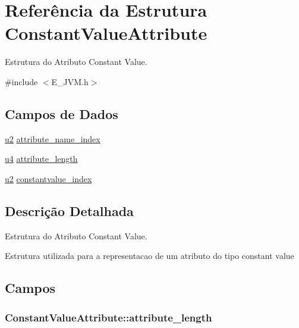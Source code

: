 \hypertarget{struct_constant_value_attribute}{}\section{Referência da Estrutura Constant\+Value\+Attribute}
\label{struct_constant_value_attribute}


Estrutura do Atributo Constant Value.  




{\ttfamily \#include $<$E\+\_\+\+J\+V\+M.\+h$>$}

\subsection*{Campos de Dados}
\begin{DoxyCompactItemize}
\item 
\hyperlink{_e___j_v_m_8h_a5f223212eef04d10a4550ded680cb1cf}{u2} \hyperlink{struct_constant_value_attribute_a29106b223531e4e2178ab37b7653c758}{attribute\+\_\+name\+\_\+index}
\item 
\hyperlink{_e___j_v_m_8h_aedf6ddc03df8caaaccbb4c60b9a9b850}{u4} \hyperlink{struct_constant_value_attribute_a18bd9666c237d41452d4ff5047e6c048}{attribute\+\_\+length}
\item 
\hyperlink{_e___j_v_m_8h_a5f223212eef04d10a4550ded680cb1cf}{u2} \hyperlink{struct_constant_value_attribute_acc45997fb7ce815924e042fec885525e}{constantvalue\+\_\+index}
\end{DoxyCompactItemize}


\subsection{Descrição Detalhada}
Estrutura do Atributo Constant Value. 

Estrutura utilizada para a representacao de um atributo do tipo constant value 

\subsection{Campos}
\hypertarget{struct_constant_value_attribute_a18bd9666c237d41452d4ff5047e6c048}{}
\subsubsection[{attribute\+\_\+length}]{ Constant\+Value\+Attribute\+::attribute\+\_\+length}\label{struct_constant_value_attribute_a18bd9666c237d41452d4ff5047e6c048}
\hypertarget{struct_constant_value_attribute_a29106b223531e4e2178ab37b7653c758}{}
